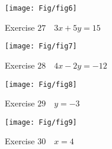 \documentclass[a4paper]{JAC2003}
\begin{document}
\begin{figure}[H] %
\centering
\caption{Exercise $27 \quad 3 x+5 y=15$} 
\texttt{[image: Fig/fig6]} %
\end{figure}

\begin{figure}[H]
\centering
\caption{Exercise $28 \quad 4 x-2 y=-12$}
\texttt{[image: Fig/fig7]}%
\end{figure}

\begin{figure}[H]
\centering
\caption{Exercise $29 \quad y=-3$}
\texttt{[image: Fig/fig8]}%
\end{figure}

\begin{figure}[H]
\centering
\caption{Exercise $30 \quad x=4$}
\texttt{[image: Fig/fig9]}%
\end{figure}
\end{document}
